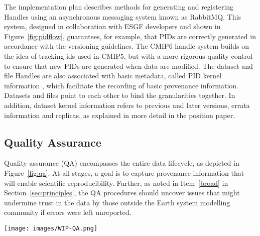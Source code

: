 \documentclass[gmd,manuscript]{copernicus}
\begin{document}
The implementation plan describes methods for generating and
registering Handles using an asynchronous messaging system known as
RabbitMQ. This system, designed in collaboration with ESGF developers
and shown in Figure~\ref{fig:pidflow}, guarantees, for example, that
PIDs are correctly generated in accordance with the versioning
guidelines. The CMIP6 handle system builds on the idea of tracking-ids
used in CMIP5, but with a more rigorous quality control to ensure that
new PIDs are generated when data are modified. The dataset and file
Handles are also associated with basic metadata, called PID kernel
information \citep{ref:zhouetal2018}, which facilitate the recording
of basic provenance information. Datasets and files point to each
other to bind the granularities together. In addition, dataset kernel
information refers to previous and later versions, errata information
and replicas, as explained in more detail in the position paper.

\subsection{Quality Assurance}
\label{sec:qa}

Quality assurance (QA) encompasses the entire data lifecycle, as
depicted in Figure~\ref{fig:qa}. At all stages, a goal is to capture
provenance information that will enable scientific reproducibility.
Further, as noted in Item~\ref{broad} in Section~\ref{sec:principles},
the QA procedures should uncover issues that might undermine trust in
the data by those outside the Earth system modelling community if
errors were left unreported.

\begin{figure*}
  \begin{center}
    \texttt{[image: images/WIP-QA.png]}
  \end{center}
  \caption{Schematic of the phases of quality assurance, with earlier
    stages in the hands of modelling centres (left), and more formal
    long-term data curation stages at right. Quality assurance is
    applied both to the data (D, above) as well as the metadata (M)
    describing the data. Figure drawn from the WIP's Quality Assurance
    position paper.}
  \label{fig:qa}
\end{figure*}
\end{document}
